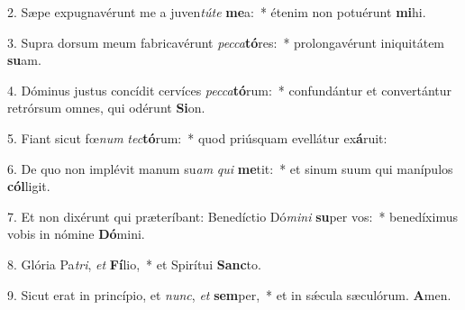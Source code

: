 2. Sæpe expugnavérunt me a juven\textit{tú}\textit{te} \textbf{me}a:~*  étenim non potuérunt \textbf{mi}hi.\

3. Supra dorsum meum fabricavérunt \textit{pec}\textit{ca}\textbf{tó}res:~*  prolongavérunt iniquitátem \textbf{su}am.\

4. Dóminus justus concídit cervíces \textit{pec}\textit{ca}\textbf{tó}rum:~*  confundántur et convertántur retrórsum omnes, qui odérunt \textbf{Si}on.\

5. Fiant sicut fœ\textit{num} \textit{tec}\textbf{tó}rum:~*  quod priúsquam evellátur ex\textbf{á}ruit:\

6. De quo non implévit manum su\textit{am} \textit{qui} \textbf{me}tit:~*  et sinum suum qui manípulos \textbf{cól}ligit.\

7. Et non dixérunt qui præteríbant: Benedíctio Dó\textit{mi}\textit{ni} \textbf{su}per vos:~*  benedíximus vobis in nómine \textbf{Dó}mini.\

8. Glória Pa\textit{tri}, \textit{et} \textbf{Fí}lio,~*  et Spirítui \textbf{Sanc}to.\

9. Sicut erat in princípio, et \textit{nunc}, \textit{et} \textbf{sem}per,~*  et in sǽcula sæculórum. \textbf{A}men.\

